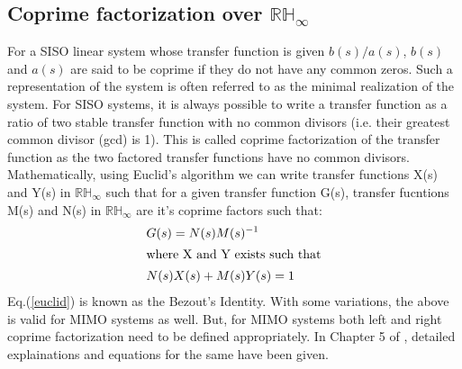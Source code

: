 \documentclass[a4paper,12pt]{article}
\begin{document}
	\subsection{Coprime factorization over $\mathbb{RH_{\infty}}$} 
	\label{coprimesect}For a SISO linear system whose transfer function is given $b(s)/a(s)$, $b(s)$ and $a(s)$ are said to be coprime if they do not have any common zeros. Such a representation of the system is often referred to as the minimal realization of the system. For SISO systems, it is always possible to write a transfer function as a ratio of two stable transfer function with no common divisors (i.e. their greatest common divisor (gcd) is 1). This is called coprime factorization of the transfer function as the two factored transfer functions have no common divisors. Mathematically, using Euclid's algorithm we can write transfer functions X(s) and Y(s) in $\mathbb{RH_{\infty}}$ such that for a given transfer function G(s), transfer fucntions M(s) and N(s) in $\mathbb{RH_{\infty}}$ are it's coprime factors such that:
	\begin{align}
		&G(s) = N(s)M(s)^{-1}\\
		\intertext{where X and Y exists such that}
		&N(s)X(s)+M(s)Y(s)=1
		\label{euclid}
	\end{align}
	Eq.(\ref{euclid}) is known as the Bezout's Identity. With some variations, the above is valid for MIMO systems as well. But, for MIMO systems both left and right coprime factorization need to be defined appropriately. In Chapter 5 of \cite{book}, detailed explainations and equations for the same have been given.
% 
%			  
%			  
\end{document}
